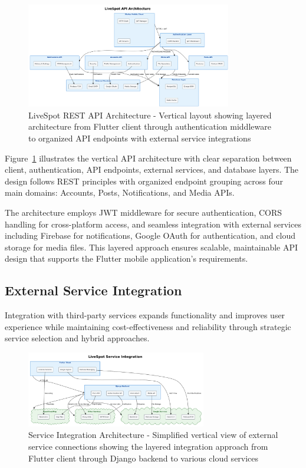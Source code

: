 \begin{figure}[h!]
    \centering
    \includegraphics[width=0.8\textwidth]{figures/api_architecture}
    \caption{LiveSpot REST API Architecture - Vertical layout showing layered architecture from Flutter client through authentication middleware to organized API endpoints with external service integrations}
    \label{fig:api_architecture}
\end{figure}

Figure~\ref{fig:api_architecture} illustrates the vertical API architecture with clear separation between client, authentication, API endpoints, external services, and database layers. The design follows REST principles with organized endpoint grouping across four main domains: Accounts, Posts, Notifications, and Media APIs.

The architecture employs JWT middleware for secure authentication, CORS handling for cross-platform access, and seamless integration with external services including Firebase for notifications, Google OAuth for authentication, and cloud storage for media files. This layered approach ensures scalable, maintainable API design that supports the Flutter mobile application's requirements.

\subsection{External Service Integration}

Integration with third-party services expands functionality and improves user experience while maintaining cost-effectiveness and reliability through strategic service selection and hybrid approaches.

\begin{figure}[h!]
    \centering
    \includegraphics[width=0.7\textwidth]{figures/service_integrations}
    \caption{Service Integration Architecture - Simplified vertical view of external service connections showing the layered integration approach from Flutter client through Django backend to various cloud services}
    \label{fig:service_integrations}
\end{figure}

